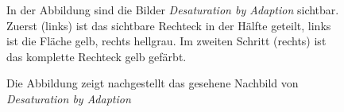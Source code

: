 \documentclass[11pt]{article}
\begin{document}
\begin{figure}[H]
\caption{In der Abbildung sind die Bilder \textit{Desaturation by Adaption} sichtbar. Zuerst (links) ist das sichtbare Rechteck in der Hälfte geteilt, links ist die Fläche gelb, rechts hellgrau. Im zweiten Schritt (rechts) ist das komplette Rechteck gelb gefärbt.}
\label{desat}
\end{figure}

\begin{figure}[H]
\caption{Die Abbildung zeigt nachgestellt das gesehene Nachbild von \textit{Desaturation by Adaption}}
\label{desat_nb}
\end{figure}
\end{document}

